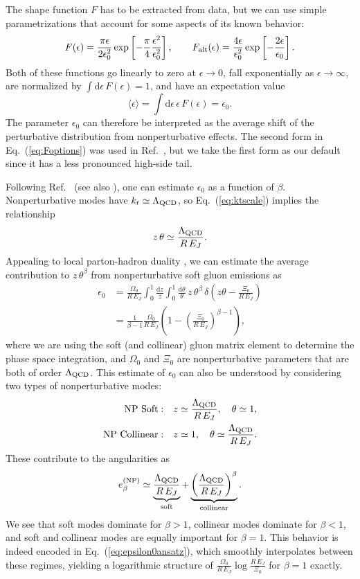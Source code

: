\documentclass[11pt,letterpaper]{article}
\newcommand{\df}{\text{d}}
\newcommand{\vev}[1]{\langle #1 \rangle}
\DeclareRobustCommand{\Eq}[1]{Eq.~(\ref{#1})}
\DeclareRobustCommand{\Ref}[1]{Ref.~\cite{#1}}
\newcommand{\be}{\begin{equation}}
\newcommand{\ee}{\end{equation}}
\begin{document}
The shape function $F$ has to be extracted from data, but we can use simple parametrizations that account for some aspects of its known behavior:
\be
\label{eq:Foptions}
F(\epsilon) = \frac{\pi \epsilon}{2 \epsilon_0^2} \exp\left[-\frac{\pi}{4} \frac{\epsilon^2}{\epsilon_0^2} \right], \qquad F_{\rm alt}(\epsilon) = \frac{4\epsilon}{\epsilon_0^2} \exp \left[-\frac{2 \epsilon}{\epsilon_0} \right].
\ee
Both of these functions go linearly to zero at $\epsilon \to 0$, fall exponentially as $\epsilon \to \infty$, are normalized by $\int \df \epsilon \,  F(\epsilon) = 1$, and have an expectation value
\be
\vev{\epsilon} = \int \df \epsilon \, \epsilon \, F(\epsilon) = \epsilon_0.
\ee
The parameter $\epsilon_0$ can therefore be interpreted as the average shift of the perturbative distribution from nonperturbative effects.   The second form in \Eq{eq:Foptions} was used in \Ref{Stewart:2014nna}, but we take the first form as our default since it has a less pronounced high-side tail.

Following \Ref{Larkoski:2013paa} (see also \cite{Manohar:1994kq,Banfi:2004yd}), one can estimate $\epsilon_0$ as a function of $\beta$.  Nonperturbative modes have $k_t \simeq \Lambda_{\rm QCD}$, so \Eq{eq:ktscale} implies the relationship
\be
z \, \theta \simeq \frac{\Lambda_{\rm QCD}}{R \, E_J}.
\ee
Appealing to local parton-hadron duality \cite{Azimov:1984np}, we can estimate the average contribution to $z \, \theta^\beta$ from nonperturbative soft gluon emissions as
\begin{align}
\epsilon_0 &= \frac{\Omega_0}{R \, E_J} \int_0^1 \frac{\df z}{z} \int_0^1 \frac{ \df \theta}{ \theta} \, z \, \theta^\beta \, \delta\left(z \theta - \frac{\Xi_0}{R \, E_J} \right) \nonumber \\
&= \frac{1}{\beta - 1} \frac{\Omega_0}{R \, E_J} \left( 1 - \left(\frac{\Xi_0}{R \, E_J} \right)^{\beta -1} \right),  \label{eq:epsilon0ansatz}
\end{align}
where we are using the soft (and collinear) gluon matrix element to determine the phase space integration, and $\Omega_0$ and $\Xi_0$ are nonperturbative parameters that are both of order $\Lambda_{\rm QCD}$.  This estimate of $\epsilon_0$ can also be understood by considering two types of nonperturbative modes:
\begin{align}
\text{NP Soft}: & \quad z \simeq \frac{\Lambda_{\rm QCD}}{R \, E_J}, \quad \theta \simeq 1, \\
\text{NP Collinear}: & \quad z \simeq 1, \quad \theta \simeq \frac{\Lambda_{\rm QCD}}{R \, E_J}.
\end{align}
These contribute to the angularities as
\be
e_\beta^{\text{(NP)}} \simeq \underbrace{\frac{\Lambda_{\rm QCD}}{R \, E_J}}_{\text{soft}} + \underbrace{\left( \frac{\Lambda_{\rm QCD}}{R \, E_J} \right)^\beta}_{\text{collinear}}.
\ee
We see that soft modes dominate for $\beta > 1$, collinear modes dominate for $\beta < 1$, and soft and collinear modes are equally important for $\beta = 1$.  This behavior is indeed encoded in \Eq{eq:epsilon0ansatz}, which smoothly interpolates between these regimes, yielding a logarithmic structure of $\frac{\Omega_0}{R \, E_J} \log \frac{R \, E_J}{\Xi_0}$ for $\beta = 1$ exactly.
\end{document}
